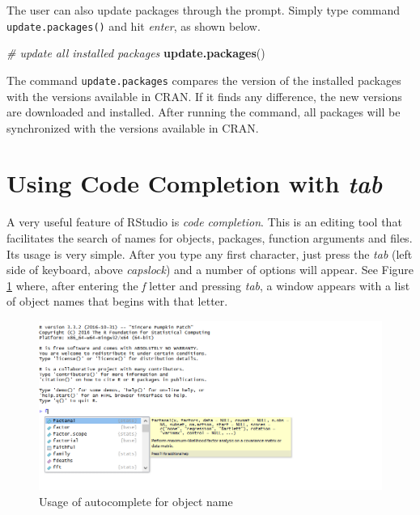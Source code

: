\documentclass[11pt,]{book}
\newenvironment{Shaded}{\begin{snugshade}}{\end{snugshade}}
\newcommand{\KeywordTok}[1]{\textcolor[rgb]{0.27,0.27,0.27}{\textbf{#1}}}
\newcommand{\CommentTok}[1]{\textcolor[rgb]{0.56,0.35,0.01}{\textit{#1}}}
\newcommand{\NormalTok}[1]{#1}
\begin{document}
The user can also update packages through the prompt. Simply type
command \texttt{update.packages()} and hit \emph{enter}, as shown below.

\begin{Shaded}
\begin{Highlighting}[]
\CommentTok{# update all installed packages}
\KeywordTok{update.packages}\NormalTok{()}
\end{Highlighting}
\end{Shaded}

The command \texttt{update.packages} compares the version of the
installed packages with the versions available in CRAN. If it finds any
difference, the new versions are downloaded and installed. After running
the command, all packages will be synchronized with the versions
available in CRAN.

\section{\texorpdfstring{Using Code Completion with
\emph{tab}}{Using Code Completion with tab}}\label{using-code-completion-with-tab}

A very useful feature of RStudio is \emph{code completion}. This is an
editing tool that facilitates the search of names for objects, packages,
function arguments and files. Its usage is very simple. After you type
any first character, just press the \emph{tab} (left side of keyboard,
above \emph{capslock}) and a number of options will appear. See Figure
\ref{fig:autocomplete} where, after entering the \emph{f} letter and
pressing \emph{tab}, a window appears with a list of object names that
begins with that letter. 

\begin{figure}[!htbp]

{\centering \includegraphics[width=1\linewidth]{figs/autocomplete} 

}

\caption{Usage of autocomplete for object name}\label{fig:autocomplete}
\end{figure}
\end{document}
